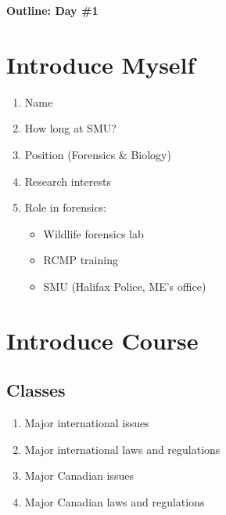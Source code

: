 \documentclass[hidelinks]{article}
\begin{document}



\Huge{\textbf{\textcolor{smured}{Outline: Day \#1}}}\normalsize{}


\section{Introduce Myself}
	\begin{enumerate}
		\item Name
		\item How long at SMU?
		\item Position (Forensics \& Biology)
		\item Research interests
		\item Role in forensics:
			\begin{itemize}
				\item Wildlife forensics lab
				\item RCMP training
				\item SMU (Halifax Police, ME's office)
			\end{itemize}
	\end{enumerate}


\section{Introduce Course}

	\subsection{Classes}
		\begin{enumerate}
			\item Major international issues
			\item Major international laws and regulations
			\item Major Canadian issues
			\item Major Canadian laws and regulations
		\end{enumerate}
\end{document}
